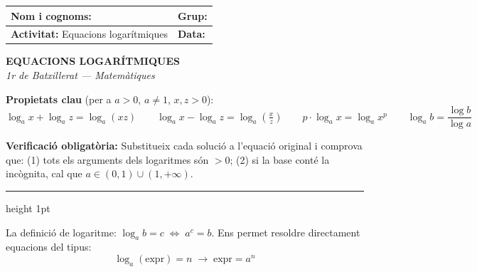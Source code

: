 \documentclass[12pt,a4paper]{article}
\newcounter{tipus}
\begin{document}

\begingroup
\renewcommand{\arraystretch}{2.2}
\begin{tabularx}{\textwidth}{|X|p{4cm}|}
    \hline
    \textbf{Nom i cognoms:} & \textbf{Grup:} \\ \hline
    \textbf{Activitat:} Equacions logarítmiques & \textbf{Data:} \\ \hline
\end{tabularx}
\endgroup

\vspace{0.4cm}

\begin{center}
    {\Large \textbf{EQUACIONS LOGARÍTMIQUES}}\\[4pt]
    {\small \textit{1r de Batxillerat --- Matemàtiques}}
\end{center}

\vspace{0.2cm}

\begin{metodebox}
\textbf{Propietats clau} (per a $a>0$, $a\neq 1$, $x,z > 0$):
\[
\log_a x + \log_a z = \log_a(xz) \qquad
\log_a x - \log_a z = \log_a\!\left(\tfrac{x}{z}\right) \qquad
p\cdot\log_a x = \log_a x^p \qquad
\log_a b = \frac{\log b}{\log a}
\]
\begin{verificaciobox}
\textbf{Verificació obligatòria:} Substitueix cada solució a l'equació original i comprova que:
(1) tots els arguments dels logaritmes són $>0$;\quad
(2) si la base conté la incògnita, cal que $a \in (0,1)\cup(1,+\infty)$.
\end{verificaciobox}
\end{metodebox}

\vspace{0.3cm}

\vspace{0.12cm}\hrule height 1pt\vspace{0.25cm}

\begin{metodebox}
La definició de logaritme: $\log_a b = c \;\Longleftrightarrow\; a^c = b$. Ens permet resoldre directament equacions del tipus:
\[
\log_a(\text{expr}) = n \;\longrightarrow\; \text{expr} = a^n
\]
\end{metodebox}
\end{document}
